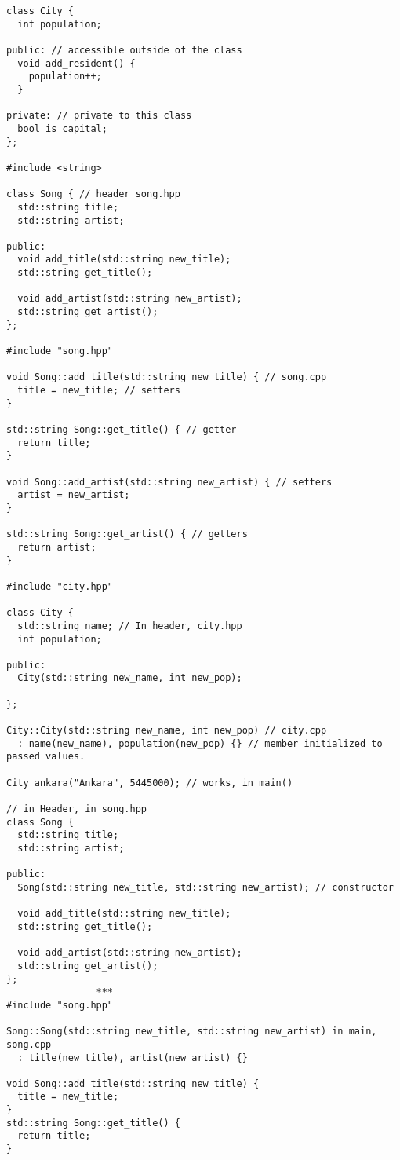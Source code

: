 \begin{verbatim}
class City {
  int population; 
 
public: // accessible outside of the class
  void add_resident() { 
    population++;
  }

private: // private to this class
  bool is_capital;
};

#include <string>

class Song { // header song.hpp
  std::string title;
  std::string artist;

public:
  void add_title(std::string new_title);
  std::string get_title();
  
  void add_artist(std::string new_artist);
  std::string get_artist();
};

#include "song.hpp"

void Song::add_title(std::string new_title) { // song.cpp
  title = new_title; // setters
}

std::string Song::get_title() { // getter
  return title;
}

void Song::add_artist(std::string new_artist) { // setters
  artist = new_artist;
}

std::string Song::get_artist() { // getters
  return artist;
}

#include "city.hpp"
 
class City {
  std::string name; // In header, city.hpp
  int population;
 
public:
  City(std::string new_name, int new_pop);
 
};
 
City::City(std::string new_name, int new_pop) // city.cpp
  : name(new_name), population(new_pop) {} // member initialized to passed values.

City ankara("Ankara", 5445000); // works, in main()

// in Header, in song.hpp
class Song {
  std::string title;
  std::string artist;

public:
  Song(std::string new_title, std::string new_artist); // constructor

  void add_title(std::string new_title);
  std::string get_title();

  void add_artist(std::string new_artist);
  std::string get_artist();
};
                ***
#include "song.hpp"

Song::Song(std::string new_title, std::string new_artist) in main, song.cpp
  : title(new_title), artist(new_artist) {}

void Song::add_title(std::string new_title) {
  title = new_title;
}
std::string Song::get_title() {
  return title;
}


\end{verbatim}
